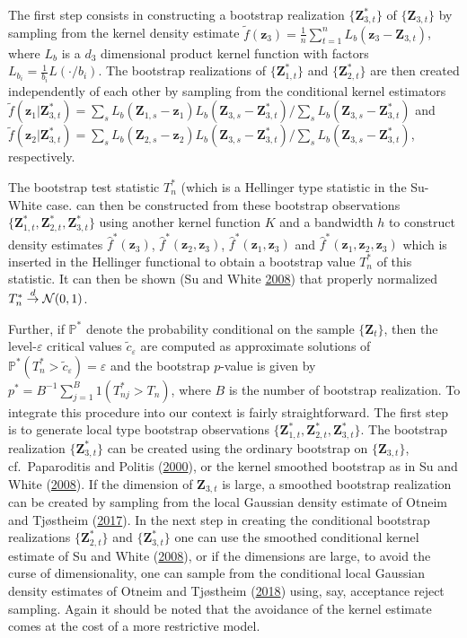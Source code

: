 \documentclass[
  12pt,
  letterpaper]{article}
\numberwithin{equation}{section}
\newcommand{\Z}{\bm{Z}}
\newcommand{\z}{\bm{z}}
\begin{document}
The first step consists in constructing a bootstrap realization \(\{\Z_{3,t}^*\}\) of \(\{\Z_{3,t}\}\) by sampling from the kernel density estimate \(\tilde{f}(\z_{3}) = \frac{1}{n}\sum_{t=1}^{n}L_b(\z_3-\Z_{3,t})\), where \(L_b\) is a \(d_3\) dimensional product kernel function with factors \(L_{b_{i}} = \frac{1}{b_{i}}L(\cdot/b_i)\). The bootstrap realizations of \(\{\Z_{1,t}^*\}\) and \(\{\Z_{2,t}^*\}\) are then created independently of each other by sampling from the conditional kernel estimators \(\tilde{f}(\z_1|\Z_{3,t}^*) = \sum_sL_b(\Z_{1,s}-\z_{1})L_b(\Z_{3,s}-\Z_{3,t}^*)/\sum_s L_b(\Z_{3,s}-\Z_{3,t}^*)\) and \(\tilde{f}(\z_2|\Z_{3,t}^*) = \sum_sL_b(\Z_{2,s}-\z_2)L_b(\Z_{3,s}-\Z_{3,t}^*)/\sum_sL_b(\Z_{3,s}-\Z_{3,t}^*)\), respectively.

The bootstrap test statistic \(T_n^*\) (which is a Hellinger type statistic in the Su-White case. can then be constructed from these bootstrap observations \(\{\Z_{1,t}^*, \Z_{2,t}^*, \Z_{3,t}^*\}\) using another kernel function \(K\) and a bandwidth \(h\) to construct density estimates \(\hat{f}^*(\z_3)\), \(\hat{f}^*(\z_2,\z_3)\), \(\hat{f}^*(\z_1,\z_3)\) and \(\hat{f}^*(\z_1,\z_2,\z_3)\) which is inserted in the Hellinger functional to obtain a bootstrap value \(T_n^*\) of this statistic. It can then be shown (Su and White \protect\hyperlink{ref-su2008nonparametric}{2008}) that properly normalized \(T_n^* \buildrel {d} \over {\to} {\cal N}(0,1)\).

Further, if \(\mathbb{P}^*\) denote the probability conditional on the sample \(\{\Z_t\}\), then the level-\(\varepsilon\) critical values \(\tilde{c}_{\varepsilon}\) are computed as approximate solutions of \(\mathbb{P}^{*}(T_n^* > \tilde{c}_{\varepsilon}) = \varepsilon\) and the bootstrap \(p\)-value is given by \(p^* = B^{-1}\sum_{j=1}^{B} 1(T_{nj}^* > T_n)\), where \(B\) is the number of bootstrap realization. To integrate this procedure into our context is fairly straightforward. The first step is to generate local type bootstrap observations \(\{\Z_{1,t}^*,\Z_{2,t}^*,\Z_{3,t}^*\}\). The bootstrap realization \(\{\Z_{3,t}^*\}\) can be created using the ordinary bootstrap on \(\{\Z_{3,t}\}\), cf.~Paparoditis and Politis (\protect\hyperlink{ref-paparoditis2000local}{2000}), or the kernel smoothed bootstrap as in Su and White (\protect\hyperlink{ref-su2008nonparametric}{2008}). If the dimension of \(\Z_{3,t}\) is large, a smoothed bootstrap realization can be created by sampling from the local Gaussian density estimate of Otneim and Tjøstheim (\protect\hyperlink{ref-otneim2017locally}{2017}). In the next step in creating the conditional bootstrap realizations \(\{\Z_{2,t}^*\}\) and \(\{\Z_{3,t}^*\}\) one can use the smoothed conditional kernel estimate of Su and White (\protect\hyperlink{ref-su2008nonparametric}{2008}), or if the dimensions are large, to avoid the curse of dimensionality, one can sample from the conditional local Gaussian density estimates of Otneim and Tjøstheim (\protect\hyperlink{ref-otneim2017conditional}{2018}) using, say, acceptance reject sampling. Again it should be noted that the avoidance of the kernel estimate comes at the cost of a more restrictive model.
\end{document}
